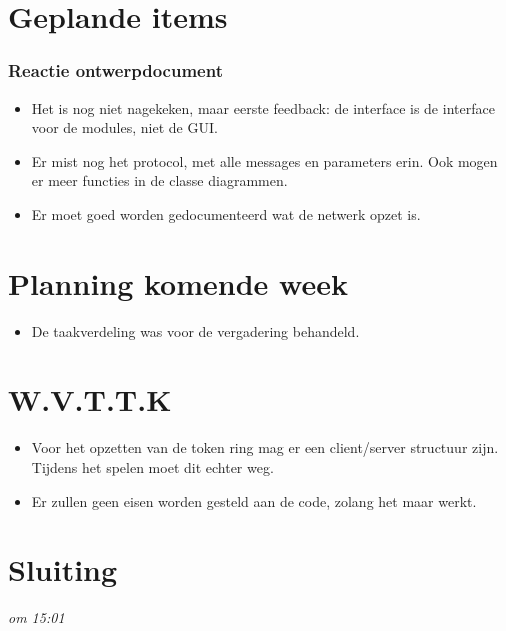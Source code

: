 \documentclass[]{article}
\begin{document}

\section{Geplande items} %
\label{sec:geplande_items}

  \subsubsection{Reactie ontwerpdocument} %
  \label{ssub:reactie_specificatie}
    \begin{itemize}
      \item Het is nog niet nagekeken, maar eerste feedback: de interface is de interface voor de modules, niet de GUI.
      \item Er mist nog het protocol, met alle messages en parameters erin. Ook mogen er meer functies in de classe diagrammen.
    \item Er moet goed worden gedocumenteerd wat de netwerk opzet is.
    \end{itemize}
  

\section{Planning komende week} %
\label{sec:planning_komende_week}
  \begin{itemize}
    \item De taakverdeling was voor de vergadering behandeld.
  \end{itemize}



\section{W.V.T.T.K} %
\label{sec:w_v_t_t_k}
  \begin{itemize}
    \item Voor het opzetten van de token ring mag er een client/server structuur zijn. Tijdens het spelen moet dit echter weg.
    \item Er zullen geen eisen worden gesteld aan de code, zolang het maar werkt.
  \end{itemize}

\section{Sluiting} %
\label{sec:sluiting}
\emph{om 15:01}
\end{document}

